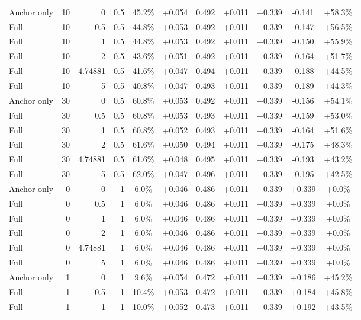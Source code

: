 \begin{table}[htbp]
\begin{tabular}{lrrrccccccc}
Anchor only & 10 & 0 & 0.5 & 45.2\% & +0.054 & 0.492 & +0.011 & +0.339 & -0.141 & +58.3\% \\
Full & 10 & 0.5 & 0.5 & 44.8\% & +0.053 & 0.492 & +0.011 & +0.339 & -0.147 & +56.5\% \\
Full & 10 & 1 & 0.5 & 44.8\% & +0.053 & 0.492 & +0.011 & +0.339 & -0.150 & +55.9\% \\
Full & 10 & 2 & 0.5 & 43.6\% & +0.051 & 0.492 & +0.011 & +0.339 & -0.164 & +51.7\% \\
Full & 10 & 4.74881 & 0.5 & 41.6\% & +0.047 & 0.494 & +0.011 & +0.339 & -0.188 & +44.5\% \\
Full & 10 & 5 & 0.5 & 40.8\% & +0.047 & 0.493 & +0.011 & +0.339 & -0.189 & +44.3\% \\
Anchor only & 30 & 0 & 0.5 & 60.8\% & +0.053 & 0.492 & +0.011 & +0.339 & -0.156 & +54.1\% \\
Full & 30 & 0.5 & 0.5 & 60.8\% & +0.053 & 0.493 & +0.011 & +0.339 & -0.159 & +53.0\% \\
Full & 30 & 1 & 0.5 & 60.8\% & +0.052 & 0.493 & +0.011 & +0.339 & -0.164 & +51.6\% \\
Full & 30 & 2 & 0.5 & 61.6\% & +0.050 & 0.494 & +0.011 & +0.339 & -0.175 & +48.3\% \\
Full & 30 & 4.74881 & 0.5 & 61.6\% & +0.048 & 0.495 & +0.011 & +0.339 & -0.193 & +43.2\% \\
Full & 30 & 5 & 0.5 & 62.0\% & +0.047 & 0.496 & +0.011 & +0.339 & -0.195 & +42.5\% \\
Anchor only & 0 & 0 & 1 & 6.0\% & +0.046 & 0.486 & +0.011 & +0.339 & +0.339 & +0.0\% \\
Full & 0 & 0.5 & 1 & 6.0\% & +0.046 & 0.486 & +0.011 & +0.339 & +0.339 & +0.0\% \\
Full & 0 & 1 & 1 & 6.0\% & +0.046 & 0.486 & +0.011 & +0.339 & +0.339 & +0.0\% \\
Full & 0 & 2 & 1 & 6.0\% & +0.046 & 0.486 & +0.011 & +0.339 & +0.339 & +0.0\% \\
Full & 0 & 4.74881 & 1 & 6.0\% & +0.046 & 0.486 & +0.011 & +0.339 & +0.339 & +0.0\% \\
Full & 0 & 5 & 1 & 6.0\% & +0.046 & 0.486 & +0.011 & +0.339 & +0.339 & +0.0\% \\
Anchor only & 1 & 0 & 1 & 9.6\% & +0.054 & 0.472 & +0.011 & +0.339 & +0.186 & +45.2\% \\
Full & 1 & 0.5 & 1 & 10.4\% & +0.053 & 0.472 & +0.011 & +0.339 & +0.184 & +45.8\% \\
Full & 1 & 1 & 1 & 10.0\% & +0.052 & 0.473 & +0.011 & +0.339 & +0.192 & +43.5\% \\

\end{tabular}
\end{table}
